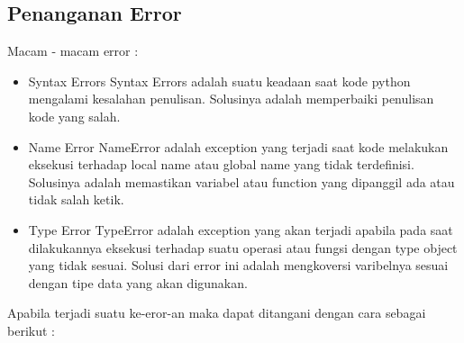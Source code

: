 \subsection{Penanganan Error}
Macam - macam error :
\begin{itemize}
	\item Syntax Errors
	Syntax Errors adalah suatu keadaan saat kode python mengalami kesalahan penulisan. Solusinya adalah memperbaiki penulisan kode yang salah.
	
	\item Name Error
	NameError adalah exception yang terjadi saat kode melakukan eksekusi terhadap local name atau global name yang tidak terdefinisi. Solusinya adalah memastikan variabel atau function yang dipanggil ada atau tidak salah ketik.
	
	\item Type Error
	TypeError adalah exception yang akan terjadi apabila pada saat dilakukannya eksekusi terhadap suatu operasi atau fungsi dengan type object yang tidak sesuai. Solusi dari error ini adalah mengkoversi varibelnya sesuai dengan tipe data yang akan digunakan.
\end{itemize}
Apabila terjadi suatu ke-eror-an maka dapat ditangani dengan cara sebagai berikut :
